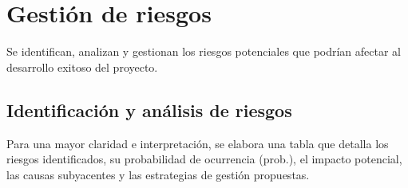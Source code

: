 \documentclass[12pt,a4paper,onecolumn,oneside]{report}
\begin{document}
\section{Gestión de riesgos}
\label{sec:Gestión de riesgos}

Se identifican, analizan y gestionan los riesgos potenciales que podrían afectar al desarrollo exitoso del proyecto.

\subsection{Identificación y análisis de riesgos}
\label{Identificación y análisis de riesgos}

Para una mayor claridad e interpretación, se elabora una tabla que detalla los riesgos identificados, su probabilidad de ocurrencia (prob.), el impacto potencial, 
las causas subyacentes y las estrategias de gestión propuestas.

\end{document}
